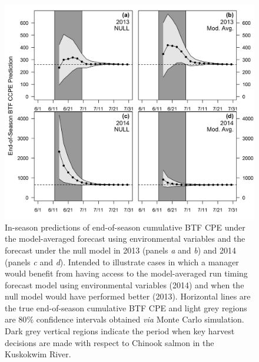 \documentclass[12pt,]{book}
\theoremstyle{definition}
\theoremstyle{definition}
\theoremstyle{definition}
\theoremstyle{remark}
\begin{document}
\begin{figure}
  \centering
  \includegraphics{img/Ch2/eos-preds.png}
  \caption{In-season predictions of end-of-season cumulative BTF CPE under the model-averaged forecast using environmental variables and the forecast under the null model in 2013 (panels \textit{a} and \textit{b}) and 2014 (panels \textit{c} and \textit{d}). Intended to illustrate cases in which a manager would benefit from having access to the model-averaged run timing forecast model using environmental variables (2014) and when the null model would have performed better (2013). Horizontal lines are the true end-of-season cumulative BTF CPE and light grey regions are 80$\%$ confidence intervals obtained \textit{via} Monte Carlo simulation. Dark grey vertical regions indicate the period when key harvest decisions are made with respect to Chinook salmon in the Kuskokwim River.}
  \label{fig:eos-preds}
\end{figure}
\end{document}
